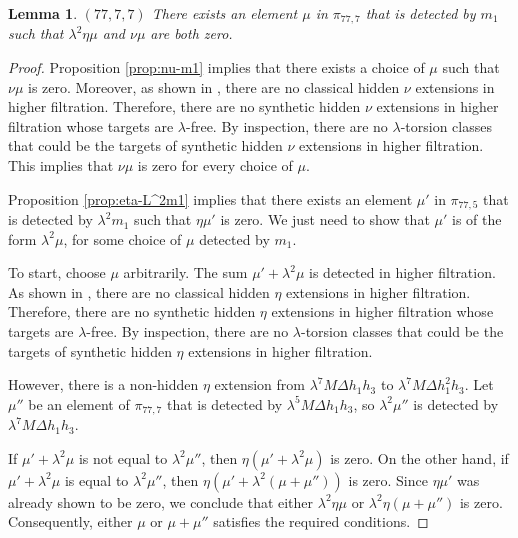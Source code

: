 \documentclass{amsart}
\newtheorem{lemma}[thm]{Lemma}
\theoremstyle{definition}
\newcommand{\lemdeg}[1]{$({#1})$}
\newcommand{\D}{\Delta}
\begin{document}
\begin{lemma} \label{lem:mu}
\lemdeg{77, 7, 7}
There exists an element $\mu$ in $\pi_{77,7}$ that
is detected by $m_1$ such that
$\lambda^2 \eta \mu$ and $\nu \mu$ are both zero.
\end{lemma}

\begin{proof}
Proposition \ref{prop:nu-m1} implies that there exists a choice of
$\mu$ such that $\nu \mu$ is zero.
Moreover, as shown in \cite{IWX}, there are no classical hidden
$\nu$ extensions in higher filtration.
Therefore, there are no synthetic hidden
$\nu$ extensions in higher filtration 
whose targets are $\lambda$-free.
By inspection, there are no $\lambda$-torsion classes that
could be the targets of synthetic hidden $\nu$ extensions 
in higher filtration.  
This implies that $\nu \mu$ is zero for every choice of $\mu$.

Proposition \ref{prop:eta-L^2m1} implies that there exists an element
$\mu'$ in $\pi_{77,5}$ that is detected by $\lambda^2 m_1$
such that $\eta \mu'$ is zero.
We just need to show that $\mu'$ is of the form
$\lambda^2 \mu$, for some choice of $\mu$ detected by $m_1$.

To start, choose $\mu$ arbitrarily.
The sum $\mu' + \lambda^2 \mu$ is detected in higher filtration.
As shown in \cite{IWX}, there are no classical hidden $\eta$
extensions in higher filtration.  Therefore,
there are no synthetic hidden $\eta$ extensions in higher
filtration whose targets are $\lambda$-free.
By inspection, there are no $\lambda$-torsion classes
that could be the targets of synthetic hidden $\eta$
extensions in higher filtration.

However, there is a non-hidden $\eta$ extension
from $\lambda^7 M \D h_1 h_3$ to $\lambda^7 M \D h_1^2 h_3$.
Let $\mu''$ be an element of $\pi_{77,7}$ that is detected
by $\lambda^5 M \D h_1 h_3$, so $\lambda^2 \mu''$ is detected
by $\lambda^7 M \D h_1 h_3$.

If $\mu' + \lambda^2 \mu$ is not equal to $\lambda^2 \mu''$, then
$\eta (\mu' + \lambda^2 \mu)$ is zero.
On the other hand,  if $\mu' + \lambda^2 \mu$ is equal to 
$\lambda^2 \mu''$, then
$\eta (\mu' + \lambda^2 (\mu + \mu''))$ is zero.
Since $\eta \mu'$ was already shown to be zero, we conclude 
that either $\lambda^2 \eta \mu$ or $\lambda^2 \eta (\mu + \mu'')$
is zero.  Consequently, either $\mu$ or $\mu + \mu''$
satisfies the required conditions.
\end{proof}
\end{document}
